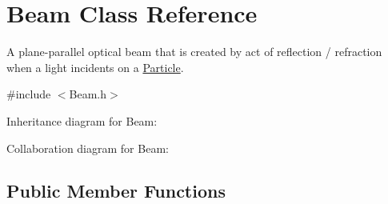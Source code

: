 \hypertarget{class_beam}{}\section{Beam Class Reference}
\label{class_beam}


A plane-\/parallel optical beam that is created by act of reflection / refraction when a light incidents on a \mbox{\hyperlink{class_particle}{Particle}}.  




{\ttfamily \#include $<$Beam.\+h$>$}



Inheritance diagram for Beam\+:


Collaboration diagram for Beam\+:
\subsection*{Public Member Functions}
